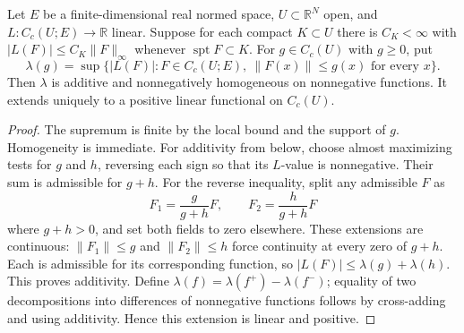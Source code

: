 \begin{lemma}\label{lem:positive-vector-variation}
Let $E$ be a finite-dimensional real normed space, $U\subset\mathbb R^N$ open, and $L:C_c(U;E)\to\mathbb R$ linear. Suppose for each compact $K\subset U$ there is $C_K<\infty$ with $|L(F)|\leq C_K\|F\|_\infty$ whenever $\operatorname{spt}F\subset K$. For $g\in C_c(U)$ with $g\geq0$, put
\[
 \lambda(g)=\sup\{|L(F)|:F\in C_c(U;E),\ \|F(x)\|\leq g(x)\text{ for every }x\}.
\]
Then $\lambda$ is additive and nonnegatively homogeneous on nonnegative functions. It extends uniquely to a positive linear functional on $C_c(U)$.
\end{lemma}
\begin{proof}
The supremum is finite by the local bound and the support of $g$. Homogeneity is immediate. For additivity from below, choose almost maximizing tests for $g$ and $h$, reversing each sign so that its $L$-value is nonnegative. Their sum is admissible for $g+h$. For the reverse inequality, split any admissible $F$ as
\[
 F_1=\frac{g}{g+h}F,\qquad F_2=\frac{h}{g+h}F
\]
where $g+h>0$, and set both fields to zero elsewhere. These extensions are continuous: $\|F_1\|\leq g$ and $\|F_2\|\leq h$ force continuity at every zero of $g+h$. Each is admissible for its corresponding function, so $|L(F)|\leq\lambda(g)+\lambda(h)$. This proves additivity. Define $\lambda(f)=\lambda(f^+)-\lambda(f^-)$; equality of two decompositions into differences of nonnegative functions follows by cross-adding and using additivity. Hence this extension is linear and positive.
\end{proof}


